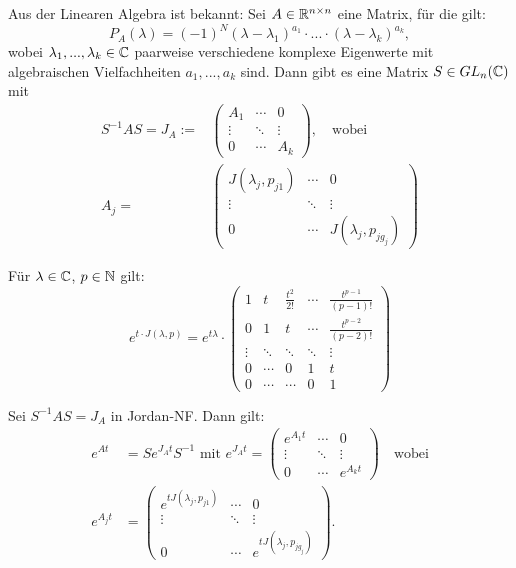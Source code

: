 \documentclass{cheat-sheet}
\begin{document}
\begin{bem}
  Aus der Linearen Algebra ist bekannt: Sei $A \in \mathbb{R}^{n \times n}$ eine Matrix, für die gilt:
  \[ P_A(\lambda) = (-1)^N (\lambda - \lambda_1)^{a_1} \cdot ... \cdot (\lambda - \lambda_k)^{a_k}, \]
  wobei $\lambda_1, ..., \lambda_k \in \mathbb{C}$ paarweise verschiedene komplexe Eigenwerte mit algebraischen Vielfachheiten $a_1, ..., a_k$ sind. Dann gibt es eine Matrix $S \in GL_n(\mathbb{C})$ mit
  \begin{align*}
    S^{-1} A S = J_A :=& \begin{pmatrix}
      A_1 & \cdots & 0\\
      \vdots & \ddots & \vdots\\
      0 & \cdots & A_k
    \end{pmatrix},
    \quad \text{wobei}\\
    A_j =& \begin{pmatrix}
      J(\lambda_j, p_{j1}) & \cdots & 0\\
      \vdots & \ddots & \vdots\\
      0 & \cdots & J(\lambda_j, p_{j g_j})
    \end{pmatrix}
  \end{align*}
\end{bem}

\begin{prop}
  Für $\lambda \in \mathbb{C}$, $p \in \mathbb{N}$ gilt:
  \[
    e^{t \cdot J(\lambda, p)} = e^{t \lambda} \cdot \begin{pmatrix}
      1 & t & \tfrac{t^2}{2!} & \cdots & \tfrac{t^{p-1}}{(p-1)!} \\
      0 & 1 & t & \cdots & \tfrac{t^{p-2}}{(p-2)!} \\
      \vdots & \ddots & \ddots & \ddots & \vdots \\
      0 & \cdots & 0 & 1 & t \\
      0 & \cdots & \cdots & 0 & 1
    \end{pmatrix}
  \]
\end{prop}

\begin{satz}
  Sei $S^{-1} A S = J_A$ in Jordan-NF. Dann gilt:
  \begin{align*}
    e^{At} &= S e^{J_A t} S^{-1} \text{ mit } e^{J_A t} = \begin{pmatrix}
      e^{A_1 t} & \cdots & 0\\
      \vdots & \ddots & \vdots\\
      0 & \cdots & e^{A_k t}
    \end{pmatrix}
    \quad \text{wobei}\\
    e^{A_j t} &= \begin{pmatrix}
      e^{t J(\lambda_j, p_{j1})} & \cdots & 0\\
      \vdots & \ddots & \vdots\\
      0 & \cdots & e^{t J(\lambda_j, p_{j g_j})}
    \end{pmatrix}.
  \end{align*}
\end{satz}
\end{document}
